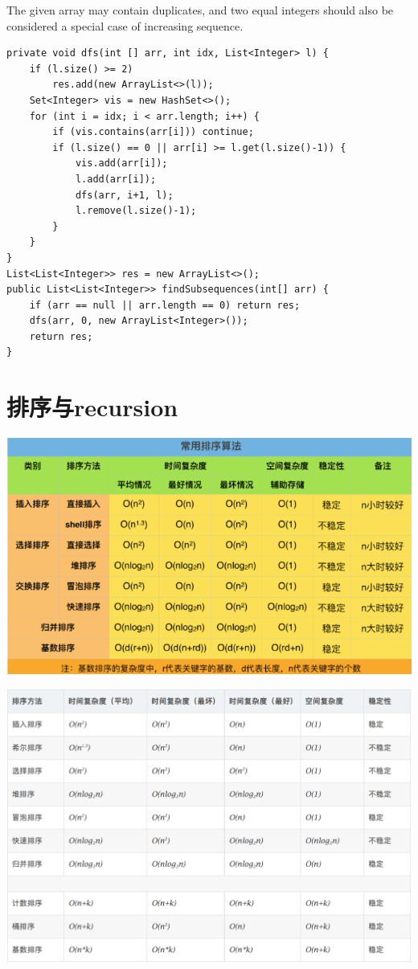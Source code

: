 \documentclass[9pt, b5paaper]{book}
\begin{document}
The given array may contain duplicates, and two equal integers should also be considered a special case of increasing sequence.
\begin{verbatim}
private void dfs(int [] arr, int idx, List<Integer> l) {
    if (l.size() >= 2)
        res.add(new ArrayList<>(l));
    Set<Integer> vis = new HashSet<>();
    for (int i = idx; i < arr.length; i++) {
        if (vis.contains(arr[i])) continue;
        if (l.size() == 0 || arr[i] >= l.get(l.size()-1)) {
            vis.add(arr[i]);
            l.add(arr[i]);
            dfs(arr, i+1, l);
            l.remove(l.size()-1);
        }
    }
}
List<List<Integer>> res = new ArrayList<>();
public List<List<Integer>> findSubsequences(int[] arr) {
    if (arr == null || arr.length == 0) return res;
    dfs(arr, 0, new ArrayList<Integer>());
    return res;
}
\end{verbatim}


\chapter{排序与recursion}
\label{sec-3}

\includegraphics[width=.9\linewidth]{./pic/sort.png}

\includegraphics[width=.9\linewidth]{./pic/sort2.png}
\end{document}
